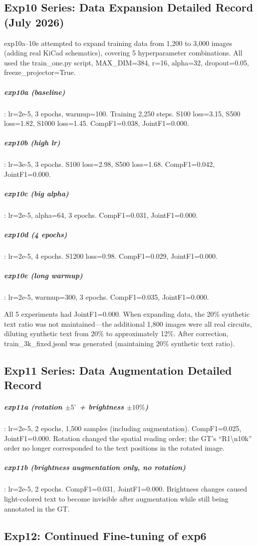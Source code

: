 \subsection{Exp10 Series: Data Expansion Detailed Record (July 2026)}

exp10a--10e attempted to expand training data from 1,200 to 3,000 images (adding real KiCad schematics), covering 5 hyperparameter combinations. All used the train\_one.py script, MAX\_DIM=384, r=16, alpha=32, dropout=0.05, freeze\_projector=True.

\subparagraph{exp10a (baseline)}: lr=2e-5, 3 epochs, warmup=100. Training 2,250 steps. S100 loss=3.15, S500 loss=1.82, S1000 loss=1.45. CompF1=0.038, JointF1=0.000.

\subparagraph{exp10b (high lr)}: lr=3e-5, 3 epochs. S100 loss=2.98, S500 loss=1.68. CompF1=0.042, JointF1=0.000.

\subparagraph{exp10c (big alpha)}: lr=2e-5, alpha=64, 3 epochs. CompF1=0.031, JointF1=0.000.

\subparagraph{exp10d (4 epochs)}: lr=2e-5, 4 epochs. S1200 loss=0.98. CompF1=0.029, JointF1=0.000.

\subparagraph{exp10e (long warmup)}: lr=2e-5, warmup=300, 3 epochs. CompF1=0.035, JointF1=0.000.

All 5 experiments had JointF1=0.000. When expanding data, the 20\% synthetic text ratio was not maintained---the additional 1,800 images were all real circuits, diluting synthetic text from 20\% to approximately 12\%. After correction, train\_3k\_fixed.jsonl was generated (maintaining 20\% synthetic text ratio).

\subsection{Exp11 Series: Data Augmentation Detailed Record}

\subparagraph{exp11a (rotation $\pm5^\circ$ + brightness $\pm10\%$)}: lr=2e-5, 2 epochs, 1,500 samples (including augmentation). CompF1=0.025, JointF1=0.000. Rotation changed the spatial reading order; the GT's ``R1\textbackslash n10k'' order no longer corresponded to the text positions in the rotated image.

\subparagraph{exp11b (brightness augmentation only, no rotation)}: lr=2e-5, 2 epochs. CompF1=0.031, JointF1=0.000. Brightness changes caused light-colored text to become invisible after augmentation while still being annotated in the GT.

\subsection{Exp12: Continued Fine-tuning of exp6}

